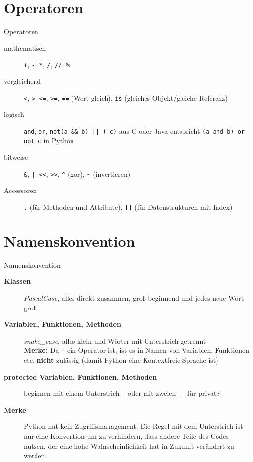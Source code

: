 \section{Operatoren}
\begin{frame}[fragile]{Operatoren}
	\begin{description}
	    \item[mathematisch] \alert{\texttt{+}}, \alert{\texttt{-}}, \alert{\texttt{*}}, \alert{\texttt{/}}, \alert{\texttt{//}}, \alert{\texttt{\%}}
	    \item[vergleichend] \alert{\texttt{<}}, \alert{\texttt{>}}, \alert{\texttt{<=}}, \alert{\texttt{>=}}, \alert{\texttt{==}} (Wert gleich), \alert{\texttt{is}} (gleiches Objekt/gleiche Referenz)
	    \item[logisch] \alert{\texttt{and}}, \alert{\texttt{or}}, \alert{\texttt{not}}\alert{\texttt{(a \&\& b) || (!c)}} aus C oder Java entspricht \alert{\texttt{(a and b) or not c}} in Python
	    \item[bitweise] \alert{\texttt{\&}}, \alert{\texttt{|}}, \alert{\texttt{<<}}, \alert{\texttt{>>}}, \alert{\texttt{\^}} (xor), \alert{\texttt{\~}} (invertieren)
	    \item[Accessoren] \alert{\texttt{.}} (für Methoden und Attribute), \alert{\texttt{[]}} (für Datenstrukturen mit Index)
	\end{description}
\end{frame}


\section{Namenskonvention}
\begin{frame}[fragile]{Namenskonvention}
	\begin{description}
	    \item[\textbf{Klassen}] \textit{PascalCase}, alles direkt zusammen, groß beginnend und jedes neue Wort groß
	    \item[\textbf{Variablen, Funktionen, Methoden}] \textit{snake\_case}, alles klein und Wörter mit Unterstrich getrennt \\
	    \textbf{Merke:} Da \alert{\texttt{-}} ein Operator ist, ist es in Namen von Variablen, Funktionen etc. \textbf{nicht} zulässig (damit Python eine Kontextfreie Sprache ist)
	    \item[\textbf{protected Variablen, Funktionen, Methoden}] beginnen mit einem Unterstrich \alert{\texttt{\_}} oder mit zweien \alert{\texttt{\_\_}} für private
	    \item[\textbf{Merke}] Python hat kein Zugriffsmanagement. Die Regel mit dem Unterstrich ist nur eine Konvention um zu verhindern, dass andere Teile des Codes nutzen, der eine hohe Wahrscheinlichkeit hat in Zukunft verändert zu werden.
	\end{description}
\end{frame}


